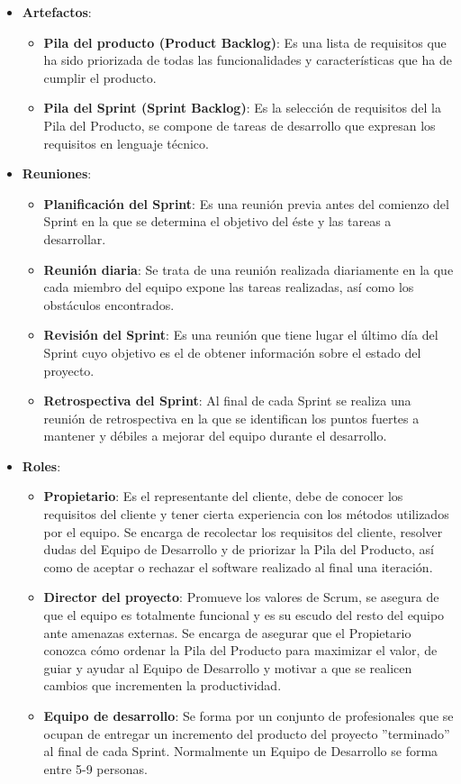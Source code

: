 \begin{itemize}
    \item \textbf{Artefactos}:
    \begin{itemize}
        \item \textbf{Pila del producto (Product Backlog)}: Es una lista de requisitos que ha sido priorizada de todas las funcionalidades y características que ha de cumplir el producto. 
        \item \textbf{Pila del Sprint (Sprint Backlog)}: Es la selección de requisitos del la Pila del Producto, se compone de tareas de desarrollo que expresan los requisitos en lenguaje técnico.
    \end{itemize}
    \item \textbf{Reuniones}:
    \begin{itemize}
        \item \textbf{Planificación del Sprint}: Es una reunión previa antes del comienzo del Sprint en la que se determina el objetivo del éste y las tareas a desarrollar.
        \item \textbf{Reunión diaria}: Se trata de una reunión realizada diariamente en la que cada miembro del equipo expone las tareas realizadas, así como los obstáculos encontrados.
        \item \textbf{Revisión del Sprint}: Es una reunión que tiene lugar el último día del Sprint cuyo objetivo es el de obtener información sobre el estado del proyecto.
        \item \textbf{Retrospectiva del Sprint}: Al final de cada Sprint se realiza una reunión de retrospectiva en la que se identifican los puntos fuertes a mantener y débiles a mejorar del equipo durante el desarrollo.
    \end{itemize}
    \item \textbf{Roles}:
        \begin{itemize}
        \item \textbf{Propietario}: Es el representante del cliente, debe de conocer los requisitos del cliente y tener cierta experiencia con los métodos utilizados por el equipo. Se encarga de recolectar los requisitos del cliente, resolver dudas del Equipo de Desarrollo y de priorizar la Pila del Producto, así como de aceptar o rechazar el software realizado al final una iteración.
        \item \textbf{Director del proyecto}: Promueve los valores de Scrum, se asegura de que el equipo es totalmente funcional y es su escudo del resto del equipo ante amenazas externas. Se encarga de asegurar que el Propietario conozca cómo ordenar la Pila del Producto para maximizar el valor, de guiar y ayudar al Equipo de Desarrollo y motivar a que se realicen cambios que incrementen la productividad.
        \item \textbf{Equipo de desarrollo}: Se forma por un conjunto de profesionales que se ocupan de entregar un incremento del producto del proyecto ''terminado'' al final de cada Sprint. Normalmente un Equipo de Desarrollo se forma entre 5-9 personas.
    \end{itemize}
\end{itemize}

